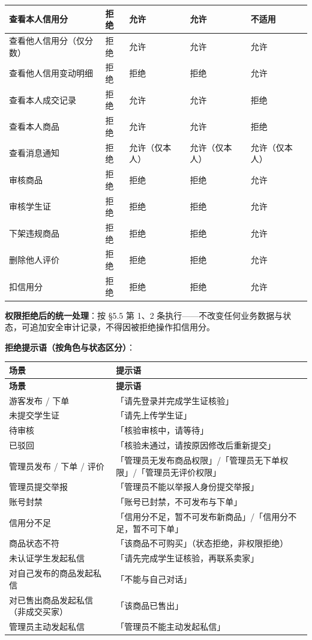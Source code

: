 \documentclass[12pt,a4paper]{ctexart}
\begin{document}
{\begin{longtable}{|p{1.81cm}|p{7.24cm}|p{1.75cm}|p{2.88cm}|p{2.32cm}|}
\hline
查看本人信用分 & 拒绝 & 允许 & 允许 & 不适用 \\
\hline
查看他人信用分（仅分数） & 拒绝 & 允许 & 允许 & 允许 \\
\hline
查看他人信用变动明细 & 拒绝 & 拒绝 & 拒绝 & 允许 \\
\hline
查看本人成交记录 & 拒绝 & 允许 & 允许 & 拒绝 \\
\hline
查看本人商品 & 拒绝 & 允许 & 允许 & 拒绝 \\
\hline
查看消息通知 & 拒绝 & 允许（仅本人） & 允许（仅本人） & 允许（仅本人） \\
\hline
审核商品 & 拒绝 & 拒绝 & 拒绝 & 允许 \\
\hline
审核学生证 & 拒绝 & 拒绝 & 拒绝 & 允许 \\
\hline
下架违规商品 & 拒绝 & 拒绝 & 拒绝 & 允许 \\
\hline
删除他人评价 & 拒绝 & 拒绝 & 拒绝 & 允许 \\
\hline
扣信用分 & 拒绝 & 拒绝 & 拒绝 & 允许 \\
\hline
\end{longtable}
}


\textbf{权限拒绝后的统一处理}：按 §5.5 第 1、2 条执行——不改变任何业务数据与状态，可追加安全审计记录，不得因被拒绝操作扣信用分。


\textbf{拒绝提示语（按角色与状态区分）}：


{\footnotesize
\begin{longtable}{|p{2.75cm}|p{13.25cm}|}
\hline
\textbf{场景} & \textbf{提示语} \\
\hline
\endfirsthead
\hline
\textbf{场景} & \textbf{提示语} \\
\hline
\endhead
\hline
\endfoot
游客发布 / 下单 & 「请先登录并完成学生证核验」 \\
\hline
未提交学生证 & 「请先上传学生证」 \\
\hline
待审核 & 「核验审核中，请等待」 \\
\hline
已驳回 & 「核验未通过，请按原因修改后重新提交」 \\
\hline
管理员发布 / 下单 / 评价 & 「管理员无发布商品权限」/「管理员无下单权限」/「管理员无评价权限」 \\
\hline
管理员提交举报 & 「管理员不能以举报人身份提交举报」 \\
\hline
账号封禁 & 「账号已封禁，不可发布与下单」 \\
\hline
信用分不足 & 「信用分不足，暂不可发布新商品」/「信用分不足，暂不可下单」 \\
\hline
商品状态不符 & 「该商品不可购买」（状态拒绝，非权限拒绝） \\
\hline
未认证学生发起私信 & 「请先完成学生证核验，再联系卖家」 \\
\hline
对自己发布的商品发起私信 & 「不能与自己对话」 \\
\hline
对已售出商品发起私信（非成交买家） & 「该商品已售出」 \\
\hline
管理员主动发起私信 & 「管理员不能主动发起私信」 \\
\hline
\end{longtable}
}
\end{document}
